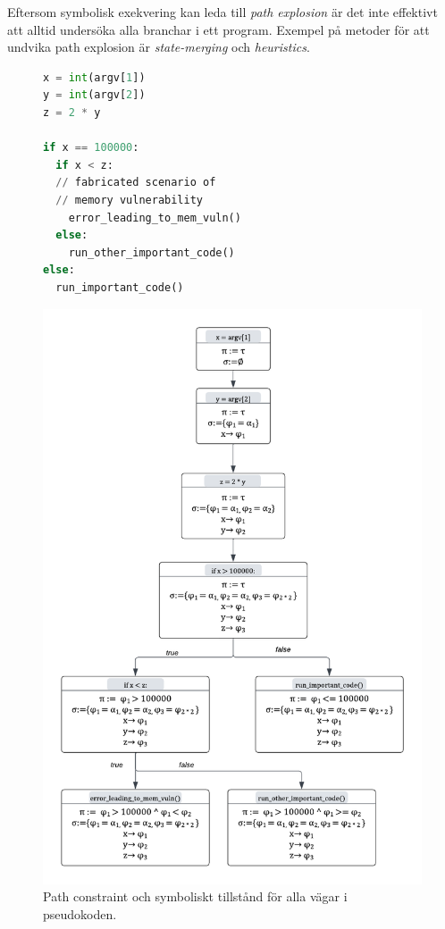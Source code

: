 Eftersom symbolisk exekvering kan leda till \emph{path explosion} är det inte effektivt 
att alltid undersöka alla branchar i ett program. Exempel på metoder för att undvika 
path explosion är \emph{state-merging} och \emph{heuristics}. 

\begin{figure}[H]
\centering
\begin{lstlisting}[label={list:first}, language=Python, frame=single]
x = int(argv[1])
y = int(argv[2])
z = 2 * y

if x == 100000: 
  if x < z:
  // fabricated scenario of 
  // memory vulnerability
    error_leading_to_mem_vuln()
  else:
    run_other_important_code()
else:
  run_important_code()

\end{lstlisting}
\caption{}
\end{figure}

\begin{figure}[H]
\centering
\includegraphics[scale=0.5]{figures/final_symbolic_example_graph.png}
\caption{Path constraint och symboliskt tillstånd för alla vägar i
    pseudokoden.}
\end{figure}



